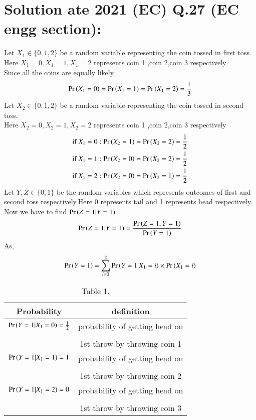 \documentclass[journal,12pt,twocolumn]{IEEEtran}
\begin{document}
\section*{Solution ate 2021 (EC) Q.27 (EC engg section):}
Let $X_1 \in \{0,1,2\}$ be a random variable representing the coin tossed in first toss.\\
Here $X_1=0,X_1=1,X_1=2$ represents coin 1 ,coin 2,coin 3 respectively\\
Since all the coins are equally likely
\begin{align}
\Pr\left(X_1=0\right)=\Pr\left(X_1=1\right)=\Pr\left(X_1=2\right)=\frac{1}{3}
\end{align}
Let $X_2 \in \{0,1,2\}$ be a random variable representing the coin tossed in second toss.\\
Here $X_2=0,X_2=1,X_2=2$ represents coin 1 ,coin 2,coin 3 respectively
\begin{align}
    \text{if } X_1=0: \Pr\left(X_2=1\right)=\Pr\left(X_2=2\right)=\frac{1}{2}\label{eq:0.0.2}\\
    \text{if } X_1=1: \Pr\left(X_2=0\right)=\Pr\left(X_2=2\right)=\frac{1}{2}\label{eq:0.0.3}\\
    \text{if } X_1=2: \Pr\left(X_2=0\right)=\Pr\left(X_2=1\right)=\frac{1}{2}\label{eq:0.0.4}
\end{align}
Let $Y,Z \in \{0,1\} $ be the random variables  which represents  outcomes of first and second toss respectively.Here 0 represents tail and 1 represents head respectively.\\
Now we have to find $\Pr\left(Z=1|Y=1\right)$\\
\begin{align}
    \Pr\left(Z=1|Y=1\right)=\frac{\Pr\left(Z=1,Y=1\right)}{\Pr\left(Y=1\right)}\label{eq:0.0.5}
\end{align}
As,
\begin{align}
   \Pr\left(Y=1\right)=\sum_{i=0}^{2} \Pr\left(Y=1|X_1=i\right)\times \Pr\left(X_1=i\right)\label{eq:0.0.6}
\end{align}
\begin{table}[h!]
\resizebox{10cm}{!}
    {
    \begin{tabular}{|c|c|}
    \hline
    Probability & definition \\
        \hline
    $\Pr\left(Y=1|X_1=0\right)=\frac{1}{2}$ & probability of getting head  on \\& \\ &  1st throw by throwing coin 1 \\
         \hline
   $\Pr\left(Y=1|X_1=1\right)=1$ & probability of getting head on \\& \\& 1st throw by throwing
         coin 2\\
         \hline
    $\Pr\left(Y=1|X_1=2\right)=0$ &probability of getting head on \\& \\&  1st throw by throwing
         coin 3\\
         \hline
    \end{tabular}
    }
    \caption{\label{tab:Table 1}Table 1.}
    
\end{table}
\end{document}
